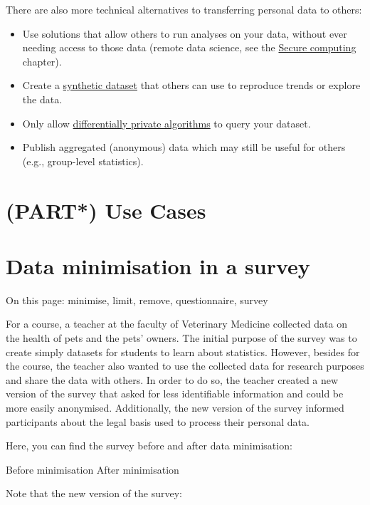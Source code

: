 \documentclass[
]{book}
\providecommand{\tightlist}{%
  \setlength{\itemsep}{0pt}\setlength{\parskip}{0pt}}
\begin{document}
There are also more technical alternatives to transferring personal data to others:

\begin{itemize}
\tightlist
\item
  Use solutions that allow others to run analyses on your data, without ever
  needing access to those data (remote data science, see the
  \protect\hyperlink{secure-computation}{Secure computing} chapter).
\item
  Create a \protect\hyperlink{synthetic-data}{synthetic dataset} that others can use to reproduce
  trends or explore the data.
\item
  Only allow \protect\hyperlink{differential-privacy}{differentially private algorithms} to query
  your dataset.
\item
  Publish aggregated (anonymous) data which may still be useful for others
  (e.g., group-level statistics).
\end{itemize}

\hypertarget{part-use-cases}{%
\chapter{(PART*) Use Cases}\label{part-use-cases}}

\hypertarget{pet-survey}{%
\chapter{Data minimisation in a survey}\label{pet-survey}}

On this page: minimise, limit, remove, questionnaire, survey

For a course, a teacher at the faculty of Veterinary Medicine collected data on
the health of pets and the pets' owners. The initial purpose of the survey was
to create simply datasets for students to learn about statistics. However,
besides for the course, the teacher also wanted to use the collected data for
research purposes and share the data with others. In order to do so, the teacher
created a new version of the survey that asked for less identifiable information
and could be more easily anonymised. Additionally, the new version of the survey
informed participants about the legal basis used to process their personal data.

Here, you can find the survey before and after data minimisation:

Before minimisation
After minimisation

Note that the new version of the survey:
\end{document}
